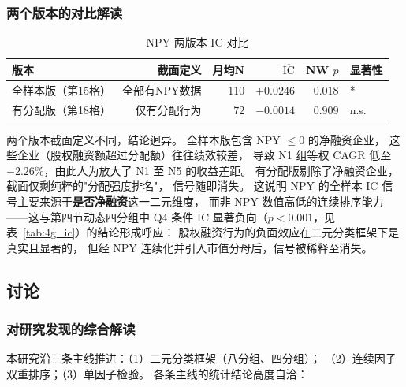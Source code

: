 \documentclass[a4paper,10pt]{article}
\begin{document}
\subsubsection{两个版本的对比解读}

\begin{table}[H]
\centering
\caption{NPY 两版本 IC 对比}
\label{tab:npy_compare}
\begin{tabular}{@{}lrrrrl@{}}
\toprule
版本 & 截面定义 & 月均N & $\overline{\mathrm{IC}}$ & NW $p$ & 显著性 \\
\midrule
全样本版（第15格） & 全部有NPY数据 & 110 & $+0.0246$ & $0.018$ & * \\
有分配版（第18格） & 仅有分配行为 & 72  & $-0.0014$ & $0.909$ & n.s. \\
\bottomrule
\end{tabular}
\end{table}

两个版本截面定义不同，结论迥异。
全样本版包含 NPY $\leq 0$ 的净融资企业，
这些企业（股权融资额超过分配额）往往绩效较差，
导致 N1 组等权 CAGR 低至 $-2.26\%$，由此人为放大了 N1 至 N5 的收益差距。
有分配版剔除了净融资企业，截面仅剩纯粹的"分配强度排名"，
信号随即消失。
这说明 NPY 的全样本 IC 信号主要来源于\textbf{是否净融资}这一二元维度，
而非 NPY 数值高低的连续排序能力——这与第四节动态四分组中
Q4 条件 IC 显著负向（$p<0.001$，见表~\ref{tab:4g_ic}）的结论形成呼应：
股权融资行为的负面效应在二元分类框架下是真实且显著的，
但经 NPY 连续化并引入市值分母后，信号被稀释至消失。

\subsection{讨论}

\subsubsection{对研究发现的综合解读}

本研究沿三条主线推进：（1）二元分类框架（八分组、四分组）；
（2）连续因子双重排序；（3）单因子检验。
各条主线的统计结论高度自洽：
\end{document}
